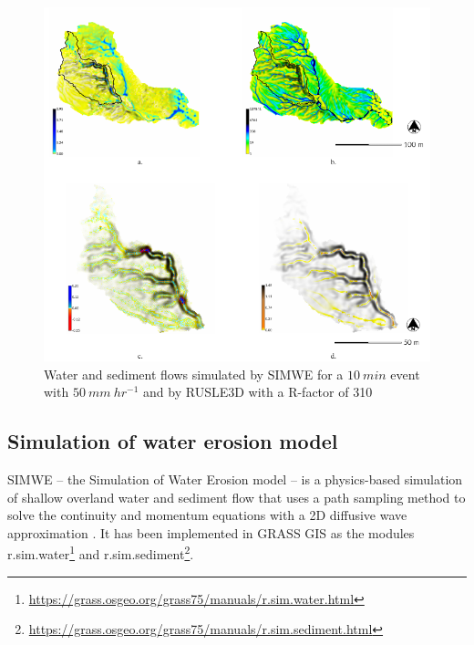 \documentclass[esurf, manuscript]{copernicus}
\begin{document}


\begin{figure}%
\center
\includegraphics[width=\textwidth,height=0.95\textheight,keepaspectratio]{figures/models.pdf}
\caption{Water and sediment flows simulated by SIMWE 
for a $10~min$ event with $50~mm~hr^{-1}$
and by RUSLE3D with a R-factor of 310
}
\label{fig:models}
\end{figure}

\subsection{Simulation of water erosion model} \label{simwe}
SIMWE -- the Simulation of Water Erosion model -- 
is a physics-based simulation of shallow overland water and sediment flow
that uses a path sampling method to solve the continuity and momentum equations 
with a 2D diffusive wave approximation 
\citep{Mitas1998,Mitasova2001,Mitasova2004}.
It has been implemented in GRASS GIS as the modules 
r.sim.water\footnote{\url{https://grass.osgeo.org/grass75/manuals/r.sim.water.html}} 
and r.sim.sediment\footnote{\url{https://grass.osgeo.org/grass75/manuals/r.sim.sediment.html}}.
\end{document}
